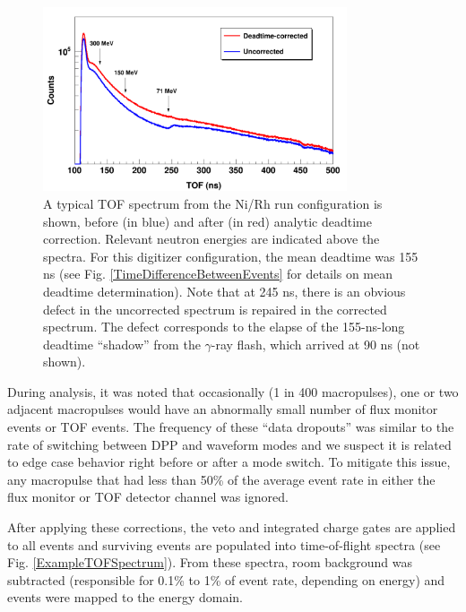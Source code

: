\begin{figure}[tb]
    \centering
    \includegraphics[width=0.8\textwidth]{figures/CorrectionEffectOnTOF.png}
    \caption[The effect of deadtime correction on a typical time-of-flight spectrum]
    {A typical TOF spectrum from the Ni/Rh
        run configuration is shown, before (in blue) and after (in red) analytic
        deadtime correction. Relevant neutron energies are indicated above the spectra.
        For this digitizer configuration, the mean deadtime was 155 ns (see Fig.
        \ref{TimeDifferenceBetweenEvents} for details on mean deadtime determination).
        Note that at 245 ns, there is an
        obvious defect in the uncorrected spectrum is repaired in the corrected
        spectrum. The defect
        corresponds to the elapse of the 155-ns-long deadtime ``shadow'' from the $\gamma$-ray
        flash, which arrived at 90 ns (not shown).}
    \label{CorrectionEffectOnTOF}
\end{figure}

During analysis, it was noted that occasionally (1 in 400 macropulses), one or two 
adjacent macropulses would have an abnormally small number of flux monitor events or 
TOF events. The frequency of these ``data dropouts'' was similar to the rate of
switching between DPP and waveform modes and we suspect it is related to edge
case behavior right before or after a mode switch. To mitigate this issue,
any macropulse that had less than 50\% of the average event rate in either the
flux monitor or TOF detector channel was ignored.

After applying these corrections, the veto and integrated charge gates are applied to 
all events and surviving events are populated into time-of-flight spectra (see Fig.
\ref{ExampleTOFSpectrum}). From these spectra, room background was subtracted
(responsible for 0.1\% to 1\% of event rate, depending on energy)
and events were mapped to the energy domain.

